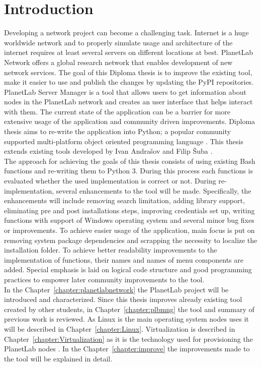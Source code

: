\chapter*{Introduction}
{}

Developing a network project can become a challenging task. Internet is a huge worldwide network and to properly simulate usage and architecture of the internet requires at least several servers on different locations at best. PlanetLab Network offers a global research network that enables development of new network services. The goal of this Diploma thesis is to improve the existing tool, make it easier to use and publish the changes by updating the PyPI repositories. PlanetLab Server Manager is a tool that allows users to get information about nodes in the PlanetLab network and creates an user interface that helps interact with them. The current state of the application can be a barrier for more extensive usage of the application and community driven improvements. Diploma thesis aims to re-write the application into Python; a popular community supported multi-platform object oriented programming language \cite{lutz2013learning}. This thesis extends existing tools developed by Ivan Andrašov \cite{andrasov2} and Filip Šuba \cite{suba1}.\\
The approach for achieving the goals of this thesis consists of using existing Bash functions and re-writing them to Python 3. During this process each functions is evaluated whether the used implementation is correct or not. During re-implementation, several enhancements to the tool will be made. Specifically, the enhancements will include removing search limitation, adding library support, eliminating pre and post installations steps, improving credentials set up, writing functions with support of Windows operating system and several minor bug fixes or improvements. To achieve easier usage of the application, main focus is put on removing system package dependencies and scrapping the necessity to localize the installation folder. To achieve better readability improvements to the implementation of functions, their names and names of menu components are added. Special emphasis is laid on logical code structure and good programming practices to empower later community improvements to the tool.\\
In the Chapter~\ref{chapter:planetlabnetwork} the PlanetLab project will be introduced and characterized. Since this thesis improves already existing tool created by other students, in Chapter~\ref{chapter:plbmng} the tool and summary of previous work is reviewed. As Linux is the main operating system nodes uses it will be described in Chapter~\ref{chapter:Linux}. Virtualization is described in Chapter~\ref{chapter:Virtualization} as it is the technology used for provisioning the PlanetLab nodes \cite{planetlababout}. In the Chapter~\ref{chapter:improve} the improvements made to the tool will be explained in detail.